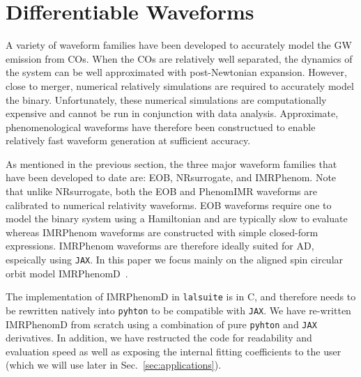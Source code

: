 \documentclass[twocolumn]{aastex631}
\newcommand{\jax}{\texttt{JAX}\xspace}
\newcommand{\lalsuite}{\texttt{lalsuite}\xspace}
\begin{document}
\section{Differentiable Waveforms}
\label{sec:waveforms}

A variety of waveform families have been developed to accurately model the GW emission from COs. 
When the COs are relatively well separated, the dynamics of the system can be well approximated with post-Newtonian expansion.
However, close to merger, numerical relatively simulations are required to accurately model the binary.
Unfortunately, these numerical simulations are computationally expensive and cannot be run in conjunction with data analysis.
Approximate, phenomenological waveforms have therefore been constructued to enable relatively fast waveform generation at sufficient accuracy.

As mentioned in the previous section, the three major waveform families that have been developed to date are:  EOB,  NRsurrogate, and IMRPhenom.
Note that unlike NRsurrogate, both the EOB and PhenomIMR waveforms are calibrated to numerical relativity waveforms.
EOB waveforms require one to model the binary system using a Hamiltonian and are typically slow to evaluate whereas IMRPhenom waveforms are constructed with simple closed-form expressions.
IMRPhenom waveforms are therefore ideally suited for AD, espeically using \jax. 
In this paper we focus mainly on the aligned spin circular orbit model IMRPhenomD~\citep{Husa:2015iqa, Khan:2015jqa}.

The implementation of IMRPhenomD in \lalsuite is in C, and therefore needs to be rewritten natively into \texttt{pyhton} to be compatible with \jax.
We have re-written IMRPhenomD from scratch using a combination of pure \texttt{pyhton} and \jax derivatives.
In addition, we have restructed the code for readability and evaluation speed as well as exposing the internal fitting coefficients to the user (which we will use later in Sec.~\ref{sec:applications}).
\end{document}
